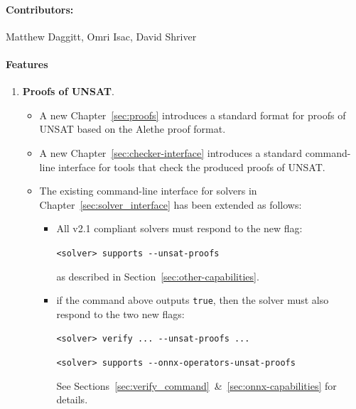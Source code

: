\paragraph{Contributors:} Matthew Daggitt, Omri Isac, David Shriver

\paragraph{Features}
\begin{enumerate}
\item \textbf{Proofs of UNSAT}.
\begin{itemize}
\item A new Chapter~\ref{sec:proofs} introduces a standard format for proofs of UNSAT based on the Alethe proof format.
\item A new Chapter~\ref{sec:checker-interface} introduces a standard command-line interface for tools that check the produced proofs of UNSAT.
\item The existing command-line interface for solvers in Chapter~\ref{sec:solver_interface} has been extended as follows:
\begin{itemize}
\item All v2.1 compliant solvers must respond to the new flag:
\begin{center}
\texttt{<solver> supports -{}-unsat-proofs}
\end{center}
as described in Section~\ref{sec:other-capabilities}.
\item if the command above outputs \texttt{true}, then the solver must also respond to the two new flags:
\begin{center}
\texttt{<solver> verify ... -{}-unsat-proofs ...} 

\texttt{<solver> supports -{}-onnx-operators-unsat-proofs}
\end{center}
See Sections~\ref{sec:verify_command}~\&~\ref{sec:onnx-capabilities} for details.
\end{itemize} 
\end{itemize} 
\end{enumerate}


